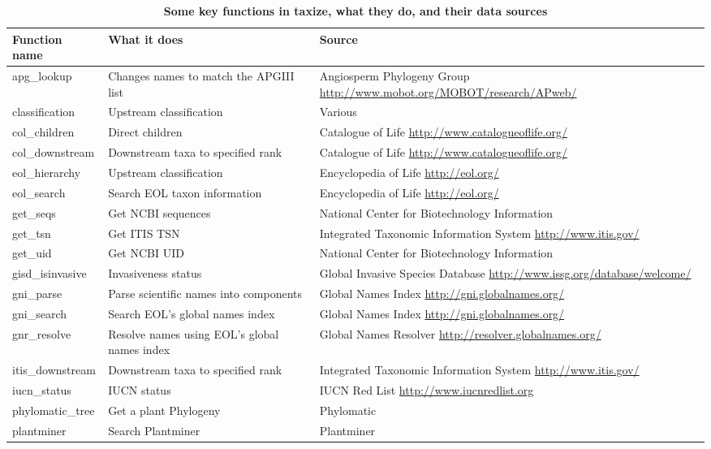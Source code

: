 \documentclass[10pt,a4paper,twocolumn]{article}\usepackage[]{graphicx}\usepackage[]{color}
\begin{document}
\begin{table*}[!ht]
\centering
\caption{
\bf{Some key functions in taxize, what they do, and their data sources}}
\begin{tabular}{|l|L|L|}
\hline
Function name & What it does & Source \\
\hline
apg\_lookup & Changes names to match the APGIII list & Angiosperm Phylogeny Group \url{http://www.mobot.org/MOBOT/research/APweb/}  \\
classification & Upstream classification & Various  \\
col\_children & Direct children & Catalogue of Life \url{http://www.catalogueoflife.org/}  \\
col\_downstream & Downstream taxa to specified rank & Catalogue of Life \url{http://www.catalogueoflife.org/}  \\
eol\_hierarchy & Upstream classification & Encyclopedia of Life \url{http://eol.org/}  \\
eol\_search & Search EOL taxon information & Encyclopedia of Life \url{http://eol.org/}  \\
get\_seqs & Get NCBI sequences & National Center for Biotechnology Information \cite{federhen2012}  \\
get\_tsn & Get ITIS TSN & Integrated Taxonomic Information System \url{http://www.itis.gov/}  \\
get\_uid & Get NCBI UID & National Center for Biotechnology Information \cite{federhen2012}  \\
gisd\_isinvasive & Invasiveness status & Global Invasive Species Database \url{http://www.issg.org/database/welcome/}  \\
gni\_parse & Parse scientific names into components & Global Names Index \url{http://gni.globalnames.org/}   \\
gni\_search & Search EOL's global names index & Global Names Index \url{http://gni.globalnames.org/}   \\
gnr\_resolve & Resolve names using EOL's global names index & Global Names Resolver \url{http://resolver.globalnames.org/}  \\
itis\_downstream & Downstream taxa to specified rank & Integrated Taxonomic Information System \url{http://www.itis.gov/}  \\
iucn\_status & IUCN status & IUCN Red List \url{http://www.iucnredlist.org}  \\
phylomatic\_tree & Get a plant Phylogeny & Phylomatic \cite{webb2005}  \\
plantminer & Search Plantminer & Plantminer \cite{carvalho2010plantminer}   \\

\end{tabular}
\end{table*}
\end{document}
